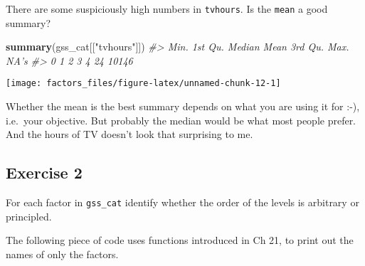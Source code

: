 \documentclass[]{book}
\newenvironment{Shaded}{\begin{snugshade}}{\end{snugshade}}
\newcommand{\CommentTok}[1]{\textcolor[rgb]{0.56,0.35,0.01}{\textit{#1}}}
\newcommand{\DataTypeTok}[1]{\textcolor[rgb]{0.13,0.29,0.53}{#1}}
\newcommand{\DecValTok}[1]{\textcolor[rgb]{0.00,0.00,0.81}{#1}}
\newcommand{\KeywordTok}[1]{\textcolor[rgb]{0.13,0.29,0.53}{\textbf{#1}}}
\newcommand{\NormalTok}[1]{#1}
\newcommand{\OperatorTok}[1]{\textcolor[rgb]{0.81,0.36,0.00}{\textbf{#1}}}
\newcommand{\StringTok}[1]{\textcolor[rgb]{0.31,0.60,0.02}{#1}}
\theoremstyle{definition}
\theoremstyle{definition}
\theoremstyle{definition}
\theoremstyle{remark}
\begin{document}
There are some suspiciously high numbers in \texttt{tvhours}. Is the
\texttt{mean} a good summary?

\begin{Shaded}
\begin{Highlighting}[]
\KeywordTok{summary}\NormalTok{(gss_cat[[}\StringTok{"tvhours"}\NormalTok{]])}
\CommentTok{#>    Min. 1st Qu.  Median    Mean 3rd Qu.    Max.    NA's }
\CommentTok{#>       0       1       2       3       4      24   10146}
\end{Highlighting}
\end{Shaded}

\begin{Shaded}
\end{Shaded}

\begin{center}\texttt{[image: factors\_files/figure-latex/unnamed-chunk-12-1]} \end{center}

Whether the mean is the best summary depends on what you are using it
for :-), i.e.~your objective. But probably the median would be what most
people prefer. And the hours of TV doesn't look that surprising to me.

\hypertarget{exercise-2-38}{%
\subsection{Exercise 2}\label{exercise-2-38}}

For each factor in \texttt{gss\_cat} identify whether the order of the
levels is arbitrary or principled.

The following piece of code uses functions introduced in Ch 21, to print
out the names of only the factors.

\begin{Shaded}
\end{Shaded}
\end{document}
